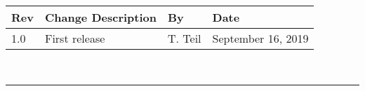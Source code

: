 \documentclass[]{BasiliskReportMemo}
\begin{document}
\makeCover

%
%
\pagestyle{empty}
{\renewcommand{\arraystretch}{2}
\noindent
\begin{longtable}{|p{0.5in}|p{3.5in}|p{1.07in}|p{0.9in}|}
\hline
{\bfseries Rev} & {\bfseries Change Description} & {\bfseries By}& {\bfseries Date} \\
\hline
1.0 & First release & T. Teil & September 16, 2019\\
\hline

\end{longtable}
}



\newpage
\setcounter{page}{1}
\pagestyle{fancy}

\tableofcontents %
~\\ \hrule ~\\ %










	









\end{document}

